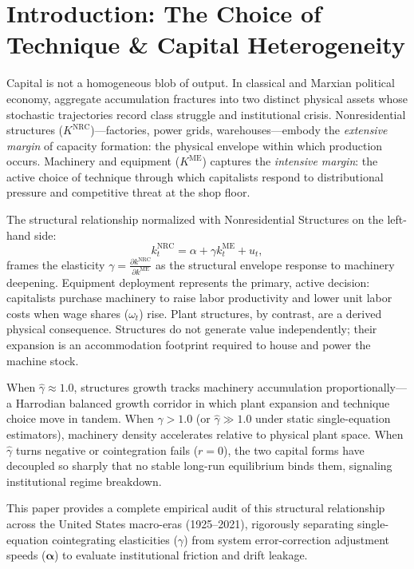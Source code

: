 \documentclass[11pt,a4paper]{article}
\begin{document}
\FloatBarrier
\section{Introduction: The Choice of Technique \& Capital Heterogeneity}

Capital is not a homogeneous blob of output. In classical and Marxian political economy, aggregate accumulation fractures into two distinct physical assets whose stochastic trajectories record class struggle and institutional crisis. Nonresidential structures ($K^{\text{NRC}}$)---factories, power grids, warehouses---embody the \textit{extensive margin} of capacity formation: the physical envelope within which production occurs. Machinery and equipment ($K^{\text{ME}}$) captures the \textit{intensive margin}: the active choice of technique through which capitalists respond to distributional pressure and competitive threat at the shop floor. 

The structural relationship normalized with Nonresidential Structures on the left-hand side:
\begin{equation}
k_t^{\text{NRC}} = \alpha + \gamma k_t^{\text{ME}} + u_t,
\end{equation}
frames the elasticity $\gamma = \frac{\partial k^{\text{NRC}}}{\partial k^{\text{ME}}}$ as the structural envelope response to machinery deepening. Equipment deployment represents the primary, active decision: capitalists purchase machinery to raise labor productivity and lower unit labor costs when wage shares ($\omega_t$) rise. Plant structures, by contrast, are a derived physical consequence. Structures do not generate value independently; their expansion is an accommodation footprint required to house and power the machine stock.

When $\hat{\gamma} \approx 1.0$, structures growth tracks machinery accumulation proportionally---a Harrodian balanced growth corridor in which plant expansion and technique choice move in tandem. When $\hat{\gamma} > 1.0$ (or $\hat{\gamma} \gg 1.0$ under static single-equation estimators), machinery density accelerates relative to physical plant space. When $\hat{\gamma}$ turns negative or cointegration fails ($r=0$), the two capital forms have decoupled so sharply that no stable long-run equilibrium binds them, signaling institutional regime breakdown.

This paper provides a complete empirical audit of this structural relationship across the United States macro-eras (1925--2021), rigorously separating single-equation cointegrating elasticities ($\gamma$) from system error-correction adjustment speeds ($\boldsymbol{\alpha}$) to evaluate institutional friction and drift leakage.
\end{document}
